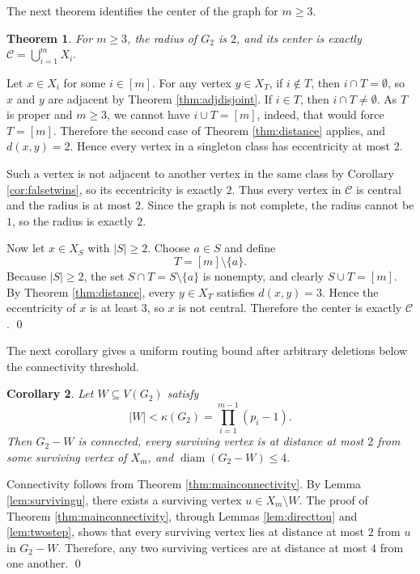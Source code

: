 \documentclass[12pt]{article}
\renewenvironment{proof}{{\bf \noindent Proof.}}{\qed}
\newtheorem{theorem}{Theorem}[section]
\newtheorem{corollary}[theorem]{Corollary}
\theoremstyle{definition}
\begin{document}
	\medskip
	 The next theorem identifies the center of the graph for $m\geq 3$.	
	\begin{theorem}\label{thm:center}
		For $m\geq 3$, the radius of $G_2$ is $2$, and its center is exactly
		$ \mathcal C=\bigcup_{i=1}^m X_{{i}}. $
	\end{theorem}
	
	\begin{proof}
		Let $x\in X_{{i}}$ for some $i\in [m]$. For any vertex $y\in X_T$, if $i\notin T$, then ${i}\cap T=\emptyset$, so $x$ and $y$ are adjacent by Theorem \ref{thm:adjdisjoint}. If $i\in T$, then ${i}\cap T\neq\emptyset$. As $T$ is proper and $m\geq 3$, we cannot have ${i}\cup T=[m]$, indeed, that would force $T=[m]$. Therefore the second case of Theorem \ref{thm:distance} applies, and $d(x,y)=2$. Hence every vertex in a singleton class has eccentricity at most $2$.
		
		Such a vertex is not adjacent to another vertex in the same class by Corollary \ref{cor:falsetwins}, so its eccentricity is exactly $2$. Thus every vertex in $\mathcal C$ is central and the radius is at most $2$. Since the graph is not complete, the radius cannot be $1$, so the radius is exactly $2$.
		
		Now let $x\in X_S$ with $|S|\geq 2$. Choose $a\in S$ and define
		$$
		T=[m]\setminus\{a\}.
		$$
		Because $|S|\geq 2$, the set $S\cap T=S\setminus\{a\}$ is nonempty, and clearly $S\cup T=[m]$. By Theorem \ref{thm:distance}, every $y\in X_T$ satisfies $d(x,y)=3$. Hence the eccentricity of $x$ is at least $3$, so $x$ is not central. Therefore the center is exactly $\mathcal C$.
	\end{proof}
	
	\medskip
	The next corollary gives a uniform routing bound after arbitrary deletions below the connectivity threshold.	
	\begin{corollary}\label{cor:deleteddiam}
		Let $W\subseteq V(G_2)$ satisfy
		$$
		|W|<\kappa(G_2)=\prod_{i=1}^{m-1}(p_i-1).
		$$
		Then $G_2-W$ is connected, every surviving vertex is at distance at most $2$ from some surviving vertex of $X_{{m}}$, and $ \operatorname{diam}(G_2-W)\leq 4. $
	\end{corollary}
	
	\begin{proof}
		Connectivity follows from Theorem \ref{thm:mainconnectivity}. By Lemma \ref{lem:survivingu}, there exists a surviving vertex $u\in X_{{m}}\setminus W$. The proof of Theorem \ref{thm:mainconnectivity}, through Lemmas \ref{lem:directtou} and \ref{lem:twostep}, shows that every surviving vertex lies at distance at most $2$ from $u$ in $G_2-W$. Therefore, any two surviving vertices are at distance at most $4$ from one another.
	\end{proof}
	
\end{document}
